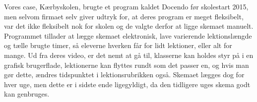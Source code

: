 Vores case, Kærbyskolen, brugte et program kaldet Docendo før skolestart 2015, men selvom firmaet selv giver udtryk for, at deres program er meget fleksibelt\cite{Docendo}, var det ikke fleksibelt nok for skolen og de valgte derfor at ligge skemaet manuelt. Programmet tillader at lægge skemaet elektronisk, lave varierende lektionslængde og tælle brugte timer, så eleverne hverken får for lidt lektioner, eller alt for mange. Ud fra deres video\cite{Docendo_video}, er det nemt at gå til, klasserne kan holdes styr på i en grafisk brugerflade, lektionerne kan flyttes rundt som det passer en, og hvis man gør dette, ændres tidspunktet i lektionsrubrikken også. Skemaet lægges dog for hver uge, men dette er i sidste ende ligegyldigt, da den tidligere uges skema godt kan genbruges.
